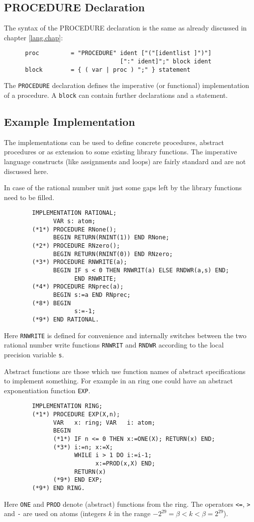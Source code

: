 \subsection{PROCEDURE Declaration}

The syntax of the PROCEDURE declaration is the same as 
already discussed in chapter \ref{lang.chap}:
\begin{verbatim}
      proc         = "PROCEDURE" ident ["("[identlist ]")"]
                                 [":" ident]";" block ident 
      block        = { ( var | proc ) ";" } statement
\end{verbatim}
The \verb/PROCEDURE/ declaration defines the 
imperative (or functional) implementation of a procedure.
A \verb/block/ can contain further declarations and 
a statement. 

\subsection{Example Implementation}

The implementations can be used to define 
concrete procedures, abstract procedures or 
as extension to some existing library functions. 
The imperative language constructs (like assignments and loops) 
are fairly standard and are not discussed here.

In case of the rational number unit just 
some gaps left by the library functions need to be filled. 
\begin{verbatim}
        IMPLEMENTATION RATIONAL;
              VAR s: atom;
        (*1*) PROCEDURE RNone();
              BEGIN RETURN(RNINT(1)) END RNone;
        (*2*) PROCEDURE RNzero();
              BEGIN RETURN(RNINT(0)) END RNzero;
        (*3*) PROCEDURE RNWRITE(a);
              BEGIN IF s < 0 THEN RNWRIT(a) ELSE RNDWR(a,s) END; 
                    END RNWRITE;
        (*4*) PROCEDURE RNprec(a);
              BEGIN s:=a END RNprec;
        (*8*) BEGIN 
                    s:=-1; 
        (*9*) END RATIONAL.
\end{verbatim}
Here \verb/RNWRITE/ is defined for convenience 
and internally switches between the two 
rational number write functions \verb/RNWRIT/ and \verb/RNDWR/
according to the local precision variable \verb/s/. 

Abstract functions are those which use function names of 
abstract specifications to implement something. 
For example in an ring one could have an abstract 
exponentiation function \verb/EXP/.
\begin{verbatim}
        IMPLEMENTATION RING;
        (*1*) PROCEDURE EXP(X,n);
              VAR   x: ring; VAR   i: atom;
              BEGIN 
              (*1*) IF n <= 0 THEN x:=ONE(X); RETURN(x) END;
              (*3*) i:=n; x:=X; 
                    WHILE i > 1 DO i:=i-1; 
                          x:=PROD(x,X) END;
                    RETURN(x)
              (*9*) END EXP;
        (*9*) END RING.
\end{verbatim}
Here \verb/ONE/ and \verb/PROD/ denote (abstract) functions 
from the ring.
The operators \verb/<=/, \verb/>/ and \verb/-/ are 
used on atoms (integers $k$ in the range 
$-2^{29} = \beta < k < \beta = 2^{29}$).  


